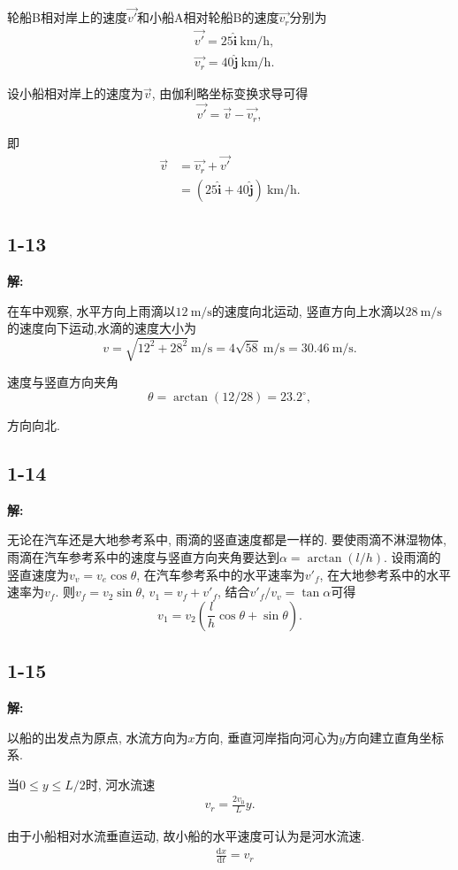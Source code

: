 \documentclass[twocolumn]{ctexart}
\begin{document}
轮船B相对岸上的速度$\vec{v'}$和小船A相对轮船B的速度$\vec{v_r}$分别为 
\begin{align*} 
&\vec{v'}=25\hat{\mathbf{i}}\ \mathrm{km/h},\\ 
&\vec{v_r}=40\hat{\mathbf{j}}\ \mathrm{km/h}. 
\end{align*} 

设小船相对岸上的速度为$\vec{v}$, 由伽利略坐标变换求导可得 
$$\vec{v'}=\vec{v}-\vec{v_r},$$ 

即 
\begin{align*} 
\vec{v}&=\vec{v_r}+\vec{v'}\\ 
&=(25\hat{\mathbf{i}}+40\hat{\mathbf{j}})\ \mathrm{km/h}. 
\end{align*} 
\subsection*{1-13} 
\noindent 
\textbf{解:} 

在车中观察, 水平方向上雨滴以$12\ \mathrm{m/s}$的速度向北运动, 竖直方向上水滴以$28\ \mathrm{m/s}$的速度向下运动,水滴的速度大小为 
$$v=\sqrt{12^2+28^2}\ \mathrm{m/s}=4\sqrt{58}\ \mathrm{m/s}=30.46\ \mathrm{m/s}.$$ 

速度与竖直方向夹角$$\theta=\arctan(12/28)=23.2^{\circ},$$

方向向北.
\subsection*{1-14} 
\noindent 
\textbf{解:} 

无论在汽车还是大地参考系中, 雨滴的竖直速度都是一样的. 要使雨滴不淋湿物体, 雨滴在汽车参考系中的速度与竖直方向夹角要达到$\alpha=\arctan(l/h)$. 设雨滴的竖直速度为$v_v=v_e\cos\theta$, 在汽车参考系中的水平速率为$v'_f$, 在大地参考系中的水平速率为$v_f$. 则$v_f=v_2\sin\theta$, $v_1=v_f+v'_f$, 结合$v'_f/v_v=\tan\alpha$可得 
$$v_1=v_2\left(\frac{l}{h}\cos\theta+\sin\theta\right).$$ 
\subsection*{1-15} 
\noindent 
\textbf{解:} 
\setcounter{equation}{0} 

以船的出发点为原点, 水流方向为$x$方向, 垂直河岸指向河心为$y$方向建立直角坐标系. 

当$0\leq y\leq L/2$时, 河水流速 
\begin{align} 
v_r=\frac{2v_0}{L}y. 
\end{align} 

由于小船相对水流垂直运动, 故小船的水平速度可认为是河水流速. 
\begin{align} 
&\frac{\mathrm{d}x}{\mathrm{d}t}=v_r 
\end{align} 
\end{document}
